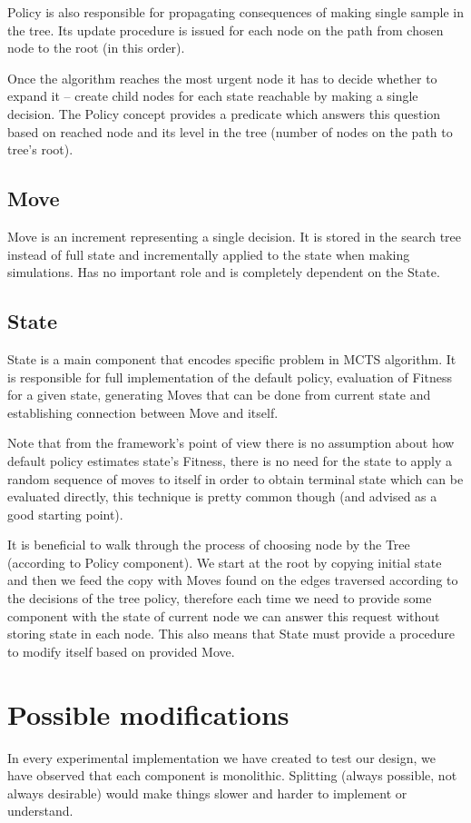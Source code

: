 Policy is also responsible for propagating consequences of making single
sample in the tree. Its update procedure is issued for each node on the path
from chosen node to the root (in this order).

Once the algorithm reaches the most urgent node it has to decide whether to expand
it -- create child nodes for each state reachable by making a single decision.
The Policy concept provides a predicate which answers this question based on
reached node and its level in the tree (number of nodes on the path to tree's
root).

\subsection{Move}
Move is an increment representing a single decision. It is stored in the search
tree instead of full state and incrementally applied to the state when making
simulations. Has no important role and is completely dependent on the State.

\subsection{State}
State is a main component that encodes specific problem in MCTS algorithm.  It
is responsible for full implementation of the default policy, evaluation of Fitness
for a given state, generating Moves that can be done from current state and
establishing connection between Move and itself.

Note that from the framework's point of view there is no assumption about how
default policy estimates state's Fitness, there is no need for the state to
apply a random sequence of moves to itself in order to obtain terminal state
which can be evaluated directly, this technique is pretty common though (and
advised as a good starting point).

It is beneficial to walk through the process of choosing node by the Tree
(according to Policy component). We start at the root by copying initial state
and then we feed the copy with Moves found on the edges traversed according to
the decisions of the tree policy, therefore each time we need to provide some
component with the state of current node we can answer this request without
storing state in each node. This also means that State must provide a procedure
to modify itself based on provided Move.

\section{Possible modifications}
In every experimental implementation we have created to test our design, we
have observed that each component is monolithic. Splitting (always possible,
not always desirable) would make things slower and harder to implement or
understand.

